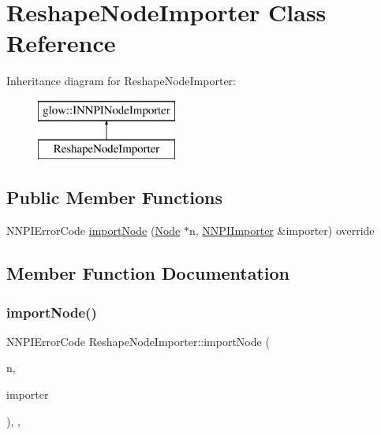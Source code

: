 \hypertarget{class_reshape_node_importer}{}\section{Reshape\+Node\+Importer Class Reference}
\label{class_reshape_node_importer}
Inheritance diagram for Reshape\+Node\+Importer\+:\begin{figure}[H]
\begin{center}
\leavevmode
\includegraphics[height=2.000000cm]{class_reshape_node_importer}
\end{center}
\end{figure}
\subsection*{Public Member Functions}
\begin{DoxyCompactItemize}
\item 
N\+N\+P\+I\+Error\+Code \hyperlink{class_reshape_node_importer_a3a7ebae599485ef5254d41c79c1ae01e}{import\+Node} (\hyperlink{classglow_1_1_node}{Node} $\ast$n, \hyperlink{classglow_1_1_n_n_p_i_importer}{N\+N\+P\+I\+Importer} \&importer) override
\end{DoxyCompactItemize}


\subsection{Member Function Documentation}
\mbox{\label{class_reshape_node_importer_a3a7ebae599485ef5254d41c79c1ae01e}} 
\subsubsection{\texorpdfstring{import\+Node()}{importNode()}}
{\footnotesize\ttfamily N\+N\+P\+I\+Error\+Code Reshape\+Node\+Importer\+::import\+Node (\begin{DoxyParamCaption}\item[{\hyperlink{classglow_1_1_node}{Node} $\ast$}]{n,  }\item[{\hyperlink{classglow_1_1_n_n_p_i_importer}{N\+N\+P\+I\+Importer} \&}]{importer }\end{DoxyParamCaption})\hspace{0.3cm}{\ttfamily [inline]}, {\ttfamily [override]}, {\ttfamily [virtual]}}

